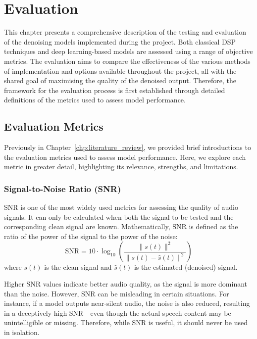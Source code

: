 \graphicspath{{content/chapters/7_evaluation/figures/}}
\chapter{Evaluation}
\label{chp:evaluation}

This chapter presents a comprehensive description of the testing and evaluation of the denoising models implemented during the project. Both classical DSP techniques and deep learning-based models are assessed using a range of objective metrics. The evaluation aims to compare the effectiveness of the various methods of implementation and options available throughout the project, all with the shared goal of maximising the quality of the denoised output. Therefore, the framework for the evaluation process is first established through detailed definitions of the metrics used to assess model performance.

\section{Evaluation Metrics}
\label{sec:evaluation_metrics_summary}

Previously in Chapter~\ref{chp:literature_review}, we provided brief introductions to the evaluation metrics used to assess model performance. Here, we explore each metric in greater detail, highlighting its relevance, strengths, and limitations.

\subsection{Signal-to-Noise Ratio (SNR)}

SNR is one of the most widely used metrics for assessing the quality of audio signals. It can only be calculated when both the signal to be tested and the corresponding clean signal are known. Mathematically, SNR is defined as the ratio of the power of the signal to the power of the noise:
\begin{equation}
\text{SNR} = 10 \cdot \log_{10} \left( \frac{\|s(t)\|^2}{\|s(t) - \hat{s}(t)\|^2} \right)
\end{equation}
where $s(t)$ is the clean signal and $\hat{s}(t)$ is the estimated (denoised) signal.

Higher SNR values indicate better audio quality, as the signal is more dominant than the noise. However, SNR can be misleading in certain situations. For instance, if a model outputs near-silent audio, the noise is also reduced, resulting in a deceptively high SNR—even though the actual speech content may be unintelligible or missing. Therefore, while SNR is useful, it should never be used in isolation.

